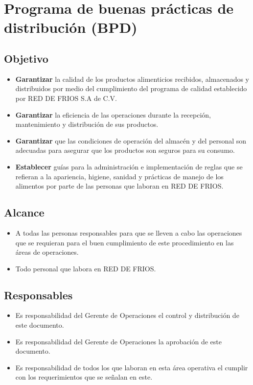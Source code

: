 \renewcommand{\Codigo}{BPD-PROG}
\renewcommand{\FechaPub}{2023-01}
\renewcommand{\Edit}{03}
\renewcommand{\Titulo}{Programa de buenas prácticas de distribución (BPD)}

\section{\Titulo}

\subsection{Objetivo}

\begin{itemize}
	\item \textbf{Garantizar} la calidad de los productos alimenticios recibidos, almacenados y distribuidos por medio del cumplimiento del programa de calidad establecido por RED DE FRIOS S.A de C.V.
	\item \textbf{Garantizar} la eficiencia de las operaciones durante la recepción, mantenimiento y distribución de sus productos.
	\item \textbf{Garantizar} que las condiciones de operación del almacén y del personal son adecuadas para asegurar que los productos son seguros para su consumo.
	\item \textbf{Establecer} guías para la administración e implementación de reglas que se refieran a la apariencia, higiene, sanidad y prácticas de manejo de los alimentos por parte de las personas que laboran en RED DE FRIOS.
\end{itemize}

\subsection{Alcance}

\begin{itemize}
	\item A todas las personas responsables para que se lleven a cabo las operaciones que se requieran para el buen cumplimiento de este procedimiento en las áreas de operaciones.
	\item Todo personal que labora en RED DE FRIOS.
\end{itemize}

\subsection{Responsables}

\begin{itemize}
	\item Es responsabilidad del Gerente de Operaciones el control y distribución de este documento.
	\item Es responsabilidad del Gerente de Operaciones la aprobación de este documento.
	\item Es responsabilidad de todos los que laboran en esta área operativa el cumplir con los requerimientos que se señalan en este.
\end{itemize}

